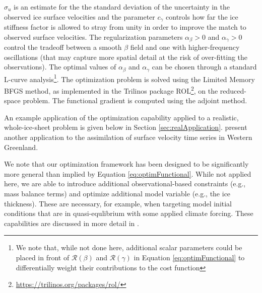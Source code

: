 $\sigma_u$ is an estimate for the the standard deviation of the uncertainty in the observed ice surface velocities and the parameter $c_{\gamma}$ controls how far the ice stiffness factor is allowed to stray from unity in order to improve the match to observed surface velocities. The regularization parameters $\alpha_\beta>0$ and $\alpha_\gamma>0$ control the tradeoff between a smooth $\beta$ field and one with higher-frequency oscillations (that may capture more spatial detail at the risk of over-fitting the observations). The optimal values of $\alpha_\beta$ and $\alpha_\gamma$ can be chosen through a standard L-curve analysis\footnote{We note that, while not done here, additional scalar parameters could be placed in front of $\mathcal R(\beta)$ and $\mathcal R(\gamma)$ in Equation \ref{eq:optimFunctional} to differentially weight their contributions to the cost function}. The optimization problem is solved using the Limited Memory BFGS method, as implemented in the Trilinos package ROL\footnote{\url{https://trilinos.org/packages/rol/}}, on the reduced-space problem. The functional gradient is computed using the adjoint method.

An example application of the optimization capability applied to a realistic, whole-ice-sheet problem is given below in Section \ref{sec:realApplication}. \cite{Hoffman2018} present another application to the assimilation of surface velocity time series in Western Greenland.   

We note that our optimization framework has been designed to be significantly more general than implied by Equation \ref{eq:optimFunctional}. While not applied here, we are able to introduce additional observational-based constraints (e.g., mass balance terms) and optimize additional model variable (e.g., the ice thickness). These are necessary, for example, when targeting model initial conditions that are in quasi-equlibrium with some applied climate forcing. These capabilities are discussed in more detail in \cite{perego2014}.
